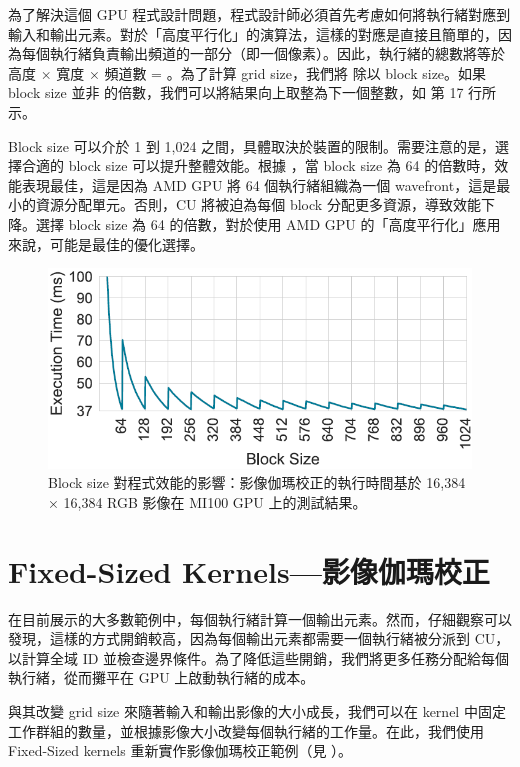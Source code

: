 為了解決這個 GPU 程式設計問題，程式設計師必須首先考慮如何將執行緒對應到輸入和輸出元素。對於「高度平行化」的演算法，這樣的對應是直接且簡單的，因為每個執行緒負責輸出頻道的一部分（即一個像素）。因此，執行緒的總數將等於高度 × 寬度 × 頻道數 = 。為了計算 grid size，我們將  除以 block size。如果 block size 並非  的倍數，我們可以將結果向上取整為下一個整數，如  第 17 行所示。

Block size 可以介於 1 到 1,024 之間，具體取決於裝置的限制。需要注意的是，選擇合適的 block size 可以提升整體效能。根據 ，當 block size 為 64 的倍數時，效能表現最佳，這是因為 AMD GPU 將 64 個執行緒組織為一個 wavefront，這是最小的資源分配單元。否則，CU 將被迫為每個 block 分配更多資源，導致效能下降。選擇 block size 為 64 的倍數，對於使用 AMD GPU 的「高度平行化」應用來說，可能是最佳的優化選擇。

\begin{figure}
    \centering
    \includegraphics[width=0.9\linewidth]{FileAusiliari/Screenshots/Figure8-3.png}
    \caption{Block size 對程式效能的影響：影像伽瑪校正的執行時間基於 16,384 × 16,384 RGB 影像在 MI100 GPU 上的測試結果。}
    \label{fig:BlockSize}
\end{figure}

\section{Fixed-Sized Kernels—影像伽瑪校正} \label{sec:fixed_sized_kernels} 
在目前展示的大多數範例中，每個執行緒計算一個輸出元素。然而，仔細觀察可以發現，這樣的方式開銷較高，因為每個輸出元素都需要一個執行緒被分派到 CU，以計算全域 ID 並檢查邊界條件。為了降低這些開銷，我們將更多任務分配給每個執行緒，從而攤平在 GPU 上啟動執行緒的成本。

與其改變 grid size 來隨著輸入和輸出影像的大小成長，我們可以在 kernel 中固定工作群組的數量，並根據影像大小改變每個執行緒的工作量。在此，我們使用 Fixed-Sized kernels 重新實作影像伽瑪校正範例（見 ）。


